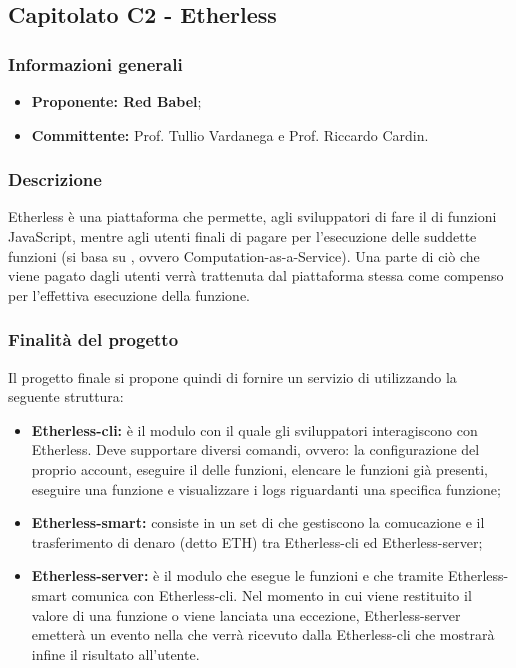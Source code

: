 \subsection{Capitolato C2 - Etherless}
	 \subsubsection{Informazioni generali}
       	\begin{itemize}
         	  \item \textbf{Proponente: Red Babel};
          	  \item \textbf{Committente: }Prof. Tullio Vardanega e Prof. Riccardo Cardin.
         \end{itemize}
	\subsubsection{Descrizione}
       Etherless è una piattaforma  che permette, agli sviluppatori di fare il  di funzioni JavaScript, mentre  agli utenti finali di pagare per l'esecuzione delle suddette funzioni (si basa su , ovvero Computation-as-a-Service).
       Una parte di ciò che viene pagato dagli utenti verrà trattenuta dal piattaforma stessa come compenso per l'effettiva esecuzione della funzione. 
    \subsubsection{Finalità del progetto}
     Il progetto finale si propone quindi di fornire un servizio di  utilizzando la seguente struttura:
    		 \begin{itemize}
    			\item \textbf{Etherless-cli: }è il modulo con il quale gli sviluppatori interagiscono con Etherless. Deve supportare diversi comandi, ovvero: la configurazione del proprio account, eseguire il  delle funzioni, elencare le funzioni già presenti, eseguire una funzione e visualizzare i logs riguardanti una specifica funzione;
    			\item \textbf{Etherless-smart: }consiste in un set di  che gestiscono la comucazione e il trasferimento di denaro (detto ETH) tra Etherless-cli ed Etherless-server;
    			\item \textbf{Etherless-server: }è il modulo che esegue le funzioni e che tramite Etherless-smart comunica con Etherless-cli.  Nel momento in cui viene restituito il valore di una funzione o viene lanciata una eccezione, Etherless-server  emetterà un evento nella  che verrà ricevuto dalla Etherless-cli che mostrarà infine il risultato all'utente.
		\end{itemize}      
